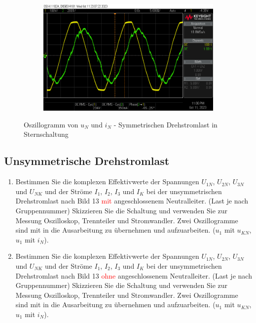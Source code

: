 	 	
 	\subsection{Unsymmetrische Drehstromlast}
	 	\begin{enumerate}[label=\alph*)]
	 		\item Bestimmen Sie die komplexen Effektivwerte der Spannungen $U_{1N}$, $U_{2N}$, $U_{3N}$ und $U_{NK}$ und der Ströme $I_{1}$, $I_{2}$, $I_{3}$ und $I_{K}$ bei der unsymmetrischen Drehstromlast nach Bild 13 \textcolor{red}{mit} angeschlossenem Neutralleiter. (Last je nach Gruppennummer)
	 		\newline
			Skizzieren Sie die Schaltung und verwenden Sie zur Messung Oszilloskop, Trennteiler und Stromwandler. Zwei Oszillogramme sind mit in die Ausarbeitung zu übernehmen und aufzuarbeiten. ($u_{1}$ mit $u_{KN}$, $u_{1}$ mit $i_{N}$).
			
			\item Bestimmen Sie die komplexen Effektivwerte der Spannungen $U_{1N}$, $U_{2N}$, $U_{3N}$ und $U_{NK}$ und der Ströme $I_{1}$, $I_{2}$, $I_{3}$ und $I_{K}$ bei der unsymmetrischen  Drehstromlast nach Bild 13 \textcolor{red}{ohne} angeschlossenem Neutralleiter. (Last je nach Gruppennummer)
			\newline
			Skizzieren Sie die Schaltung und verwenden Sie zur Messung Oszilloskop, Trennteiler und Stromwandler. Zwei Oszillogramme sind mit in die Ausarbeitung zu übernehmen und aufzuarbeiten. ($u_{1}$ mit $u_{KN}$, $u_{1}$ mit $i_{N}$). 
			
			
	 	\end{enumerate}